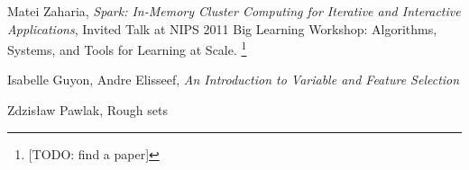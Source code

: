\documentclass[12pt]{pracamgr}
\begin{document}
\begin{thebibliography}{9}

 Matei Zaharia, \emph{Spark: In-Memory Cluster Computing for Iterative and
                  Interactive Applications}, Invited Talk at NIPS 2011 Big Learning
                  Workshop: Algorithms, Systems, and Tools for Learning at Scale.
                  \footnote{[TODO: find a paper]}
                  
 Isabelle Guyon, Andre Elisseef, \emph{An Introduction to Variable and
                Feature Selection}
                
 Zdzis\l{}aw Pawlak, Rough sets

\end{thebibliography}
\end{document}
